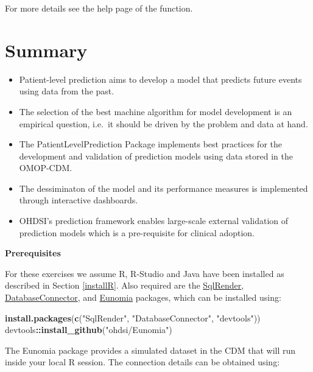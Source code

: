 \documentclass[11pt]{book}
\newenvironment{Shaded}{\begin{snugshade}}{\end{snugshade}}
\newcommand{\KeywordTok}[1]{\textcolor[rgb]{0.13,0.29,0.53}{\textbf{#1}}}
\newcommand{\NormalTok}[1]{#1}
\newcommand{\OperatorTok}[1]{\textcolor[rgb]{0.81,0.36,0.00}{\textbf{#1}}}
\newcommand{\StringTok}[1]{\textcolor[rgb]{0.31,0.60,0.02}{#1}}
\theoremstyle{definition}
\theoremstyle{definition}
\theoremstyle{definition}
\theoremstyle{remark}
\let\BeginKnitrBlock\begin \let\EndKnitrBlock\end
\begin{document}
For more details see the help page of the function.

\hypertarget{summary-10}{%
\section{Summary}\label{summary-10}}

\BeginKnitrBlock{rmdsummary}
\begin{itemize}
\item
  Patient-level prediction aims to develop a model that predicts future events using data from the past.
\item
  The selection of the best machine algorithm for model development is an empirical question, i.e.~it should be driven by the problem and data at hand.
\item
  The PatientLevelPrediction Package implements best practices for the development and validation of prediction models using data stored in the OMOP-CDM.
\item
  The dessiminaton of the model and its performance measures is implemented through interactive dashboards.
\item
  OHDSI's prediction framework enables large-scale external validation of prediction models which is a pre-requisite for clinical adoption.
\end{itemize}
\EndKnitrBlock{rmdsummary}

\textbf{Prerequisites}

For these exercises we assume R, R-Studio and Java have been installed as described in Section \ref{installR}. Also required are the \href{https://ohdsi.github.io/SqlRender/}{SqlRender}, \href{https://ohdsi.github.io/DatabaseConnector/}{DatabaseConnector}, and \href{https://ohdsi.github.io/Eunomia/}{Eunomia} packages, which can be installed using:

\begin{Shaded}
\begin{Highlighting}[]
\KeywordTok{install.packages}\NormalTok{(}\KeywordTok{c}\NormalTok{(}\StringTok{"SqlRender"}\NormalTok{, }\StringTok{"DatabaseConnector"}\NormalTok{, }\StringTok{"devtools"}\NormalTok{))}
\NormalTok{devtools}\OperatorTok{::}\KeywordTok{install_github}\NormalTok{(}\StringTok{"ohdsi/Eunomia"}\NormalTok{)}
\end{Highlighting}
\end{Shaded}

The Eunomia package provides a simulated dataset in the CDM that will run inside your local R session. The connection details can be obtained using:
\end{document}
